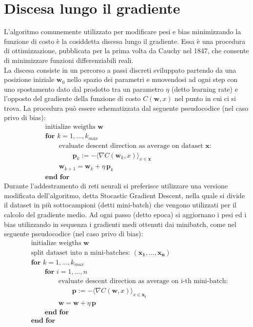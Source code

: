 \documentclass[Lau, noexaminfo, oneside]{sapthesis} %
\begin{document}
\section{Discesa lungo il gradiente}
L'algoritmo comunemente utilizzato per modificare pesi e bias minimizzando la funzione di costo è la cosiddetta discesa lungo il gradiente. Essa è una procedura di ottimizzazione, pubblicata per la prima volta da Cauchy nel 1847, che consente di minimizzare funzioni differenziabili reali. \\
La discesa consiste in un percorso a passi discreti sviluppato partendo da una posizione iniziale $\mathbf{w}_0$ nello spazio dei parametri e muovendosi ad ogni step con uno spostamento dato dal prodotto tra un parametro $\eta$ (detto learning rate) e l'opposto del gradiente della funzione di costo $C(\mathbf{w}, x)$ nel punto in cui ci si trova.
La procedura può essere schematizzata dal seguente pseudocodice (nel caso privo di bias):
\begin{align*}
& \text{initialize weigths } \mathbf{w}\\
& \textbf{for } k = 1,..., k_{max} \\
&\qquad \text{evaluate descent direction as average on dataset }\mathbf{x}\text{: } \\
& \qquad  \qquad \mathbf {p} _{k}:=- \langle \nabla C(\mathbf {w} _{k}, x) \rangle_{x \in \mathbf{x}}\\
&\qquad \mathbf {w} _{k+1}=\mathbf {w} _{k}+ \eta \, \mathbf {p} _{k}\\
&\textbf{end for}
\end{align*}
Durante l'addestramento di reti neurali si preferisce utilizzare una versione modificata dell'algoritmo, detta Stocastic Gradient Descent, nella quale si divide il dataset in più sottocampioni (detti mini-batch) che vengono utilizzati per il calcolo del gradiente medio. Ad ogni passo (detto epoca) si aggiornano i pesi ed i bias utilizzando in sequenza i gradienti medi ottenuti dai minibatch, come nel seguente pseudocodice (nel caso privo di bias):
\begin{align*}
& \text{initialize weigths } \mathbf{w}\\
& \text{split dataset into n mini-batches: }(\mathbf{x_1}, ..., \mathbf{x_n})\\
& \textbf{for } k = 1,..., k_{max} \\
& \qquad \textbf{for } i = 1,..., n \\
&\qquad \qquad {\text{evaluate descent direction as average on i-th mini-batch:}}\\
& \qquad \qquad \qquad \mathbf {p}:=- \langle \nabla C(\mathbf {w}, x)\rangle_{x \in \mathbf{x_i}} \\
&\qquad \qquad \mathbf {w}=\mathbf {w} + \eta \, \mathbf {p}\\
&\qquad \textbf{end for} \\
&\textbf{end for}
\end{align*} 
\end{document}
